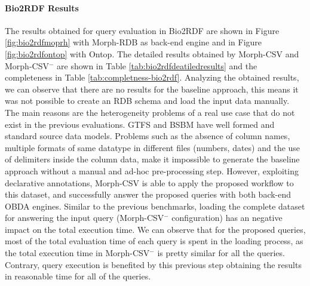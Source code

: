 \noindent\paragraph*{\textbf{Bio2RDF Results}}
The results obtained for query evaluation in Bio2RDF are shown in Figure \ref{fig:bio2rdfmoprh} with Morph-RDB as back-end engine and in Figure \ref{fig:bio2rdfontop} with Ontop. The detailed results obtained by Morph-CSV and Morph-CSV$^-$ are shown in Table \ref{tab:bio2rdfdeatiledresults} and the completeness in Table \ref{tab:completness-bio2rdf}. Analyzing the obtained results, we can observe that there are no results for the baseline approach, this means it was not possible to create an RDB schema and load the input data manually. The main reasons are the heterogeneity problems of a real use case that do not exist in the previous evaluations. GTFS and BSBM have well formed and standard source data models. Problems such as the absence of column names, multiple formats of same datatype in different files (numbers, dates) and the use of delimiters inside the column data, make it impossible to generate the baseline approach without a manual and ad-hoc pre-processing step. However, exploiting declarative annotations, Morph-CSV is able to apply the proposed workflow to this dataset, and successfully answer the proposed queries with both back-end OBDA engines. Similar to the previous benchmarks, loading the complete dataset for answering the input query (Morph-CSV$^-$ configuration) has an negative impact on the total execution time. We can observe that for the proposed queries, most of the total evaluation time of each query is spent in the loading process, as the total execution time in Morph-CSV$^-$ is pretty similar for all the queries. Contrary, query execution is benefited by this previous step obtaining the results in reasonable time for all of the queries. 


